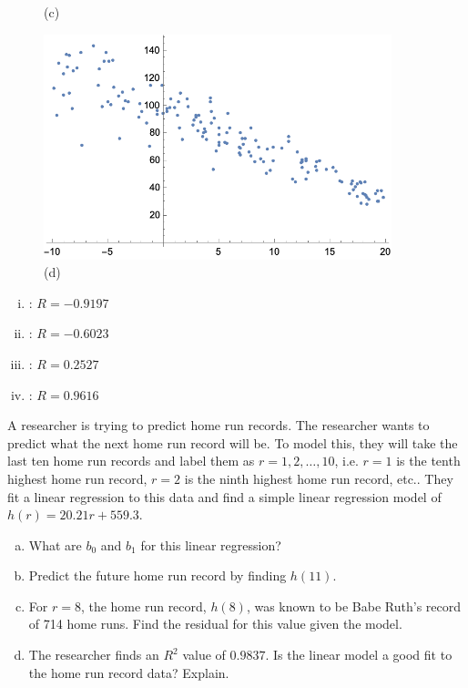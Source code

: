 \documentclass[11pt,letterpaper]{article}
\begin{document}
\begin{figure}[!ht]
\begin{minipage}{0.45\textwidth}
	   \caption*{(c)}
	\end{minipage}
	\begin{minipage}{0.45\textwidth}
	   \centering
	   \includegraphics[width=0.9\textwidth]{reg4.png}
	   \caption*{(d)}
	\end{minipage}
	\end{figure}

\begin{enumerate}[(i)]
\item \underline{\hspace{1.5cm}}: $R= -0.9197$
\item \underline{\hspace{1.5cm}}: $R= -0.6023$
\item \underline{\hspace{1.5cm}}: $R= 0.2527$
\item\underline{\hspace{1.5cm}}: $R= 0.9616$
\end{enumerate} 



\newpage



 A researcher is trying to predict home run records. The researcher wants to predict what the next home run record will be. To model this, they will take the last ten home run records and label them as $r= 1, 2, \ldots, 10$, i.e. $r= 1$ is the tenth highest home run record, $r= 2$ is the ninth highest home run record, etc.. They fit a linear regression to this data and find a simple linear regression model of $h(r)= 20.21r + 559.3$. 
	\begin{enumerate}[(a)]
	\item What are $b_0$ and $b_1$ for this linear regression?
	\item Predict the future home run record by finding $h(11)$.
	\item For $r= 8$, the home run record, $h(8)$, was known to be Babe Ruth's record of 714 home runs. Find the residual for this value given the model.
	\item The researcher finds an $R^2$ value of $0.9837$. Is the linear model a good fit to the home run record data? Explain. 
	\end{enumerate}
\end{document}
